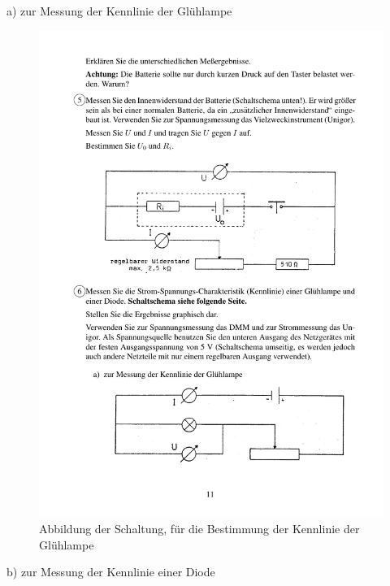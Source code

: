 \documentclass[12pt]{scrartcl}
\begin{document}
\begin{enumerate}
	a) zur Messung der Kennlinie der 				Glühlampe
	
	\begin{figure}[htbp] 
	  \centering
	    \includegraphics[trim = 1mm 15mm 1mm 151mm, clip, scale = 1]{abb_versuch_5_6a.pdf}
	  	\caption[Abbildung der Schaltung, für die Bestimmung der Kennlinie der Glühlampe]{Abbildung der Schaltung, für die Bestimmung der Kennlinie der Glühlampe\footnotemark}
	  \label{fig:abb_versuch_6a}
	\end{figure}
	
	b) zur Messung der Kennlinie einer Diode
	

\end{enumerate}
\end{document}
